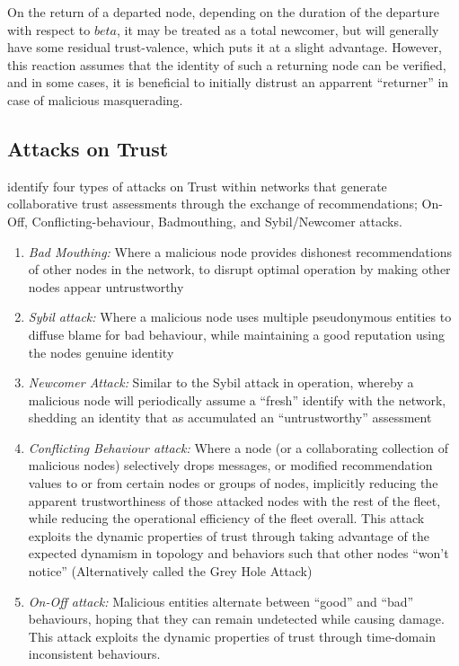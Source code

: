 On the return of a departed node, depending on the duration of the departure with respect to $beta$, it may be treated as a total newcomer, but will generally have some residual trust-valence, which puts it at a slight advantage. 
However, this reaction assumes that the identity of such a returning node can be verified, and in some cases, it is beneficial to initially distrust an apparrent ``returner'' in case of malicious masquerading.

\subsection{Attacks on Trust}

\citet{Liu2010} identify four types of attacks on Trust within networks that generate collaborative trust assessments through the exchange of recommendations; On-Off, Conflicting-behaviour, Badmouthing, and Sybil/Newcomer attacks.

\begin{enumerate}
	\item \emph{Bad Mouthing:} Where a malicious node provides dishonest recommendations of other nodes in the network, to disrupt optimal operation  by making other nodes appear untrustworthy
	\item \emph{Sybil attack:} Where a malicious node uses multiple pseudonymous entities to diffuse blame for bad behaviour, while maintaining a good reputation using the nodes genuine identity
	\item \emph{Newcomer Attack:} Similar to the Sybil attack in operation, whereby a malicious node will periodically assume a ``fresh'' identify with the network, shedding an identity that as accumulated an ``untrustworthy'' assessment
	\item \emph{Conflicting Behaviour attack:} Where a node (or a collaborating collection of malicious nodes) selectively drops messages, or modified recommendation values to or from certain nodes or groups of nodes, implicitly reducing the apparent trustworthiness of those attacked nodes with the rest of the fleet, while reducing the operational efficiency of the fleet overall.  This attack exploits the dynamic properties of trust through taking advantage of the expected dynamism in topology and behaviors such that other nodes ``won't notice'' (Alternatively called the Grey Hole Attack)
	\item \emph{On-Off attack:} Malicious entities alternate between ``good'' and ``bad'' behaviours, hoping that they can remain undetected while causing damage. This attack exploits the dynamic properties of trust through time-domain inconsistent behaviours.
\end{enumerate} 

